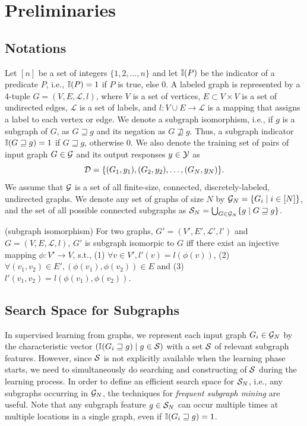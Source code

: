 \section{Preliminaries}
\subsection{Notations}
Let $[n]$ be a set of integers $\{1,2,\dots,n\}$ 
and let $\I(P)$ be the indicator of a predicate $P$, 
i.e., $\I(P)=1$ if $P$ is true, else $0$. 
A labeled graph is represented by a 4-tuple $G = (V, E, \mathcal{L}, l)$, 
where $V$ is a set of vertices, $E \subset V \times V$ is a set of undirected edges, 
$\mathcal{L}$ is a set of labels, and $l: V \cup E \rightarrow \mathcal{L}$ is a mapping 
that assigns a label to each vertex or edge.
We denote a subgraph isomorphism, i.e., if $g$ is a subgraph of $G$, as $G \sqsupseteq g$ 
and its negation as $G \not\sqsupseteq g$. 
Thus, a subgraph indicator $\I(G \sqsupseteq g) = 1$ if $G \sqsupseteq g$, otherwise 0.
We also denote the training set of pairs of input graph $G \in \Graph$ 
and its output responses $y \in \Y$ as
\begin{equation}
  \label{eq:train_data}
  \D = \{(G_1,y_1),(G_2,y_2),\dots,(G_N,y_N)\}.
\end{equation}
We assume that $\Graph$ is a set of all finite-size, connected, discretely-labeled, undirected graphs. 
We denote any set of graphs of size $N$ by $\Graph_N = \{G_i\mid i \in [N]\}$, 
and the set of all possible connected subgraphs 
as $\S_N = \bigcup_{G \in \Graph_N} \{g \mid G \sqsupseteq g\}$.

\begin{definition}{(subgraph isomorphism)}
	For two graphs, $G' = (V', E', \mathcal{L}', l')$ and $G = (V, E, \mathcal{L}, l)$, 
	$G'$ is subgraph isomorpic to $G$ iff there exist an injective mapping $\phi: V' \rightarrow V$, 
	s.t., (1) $\forall v \in V', l'(v) = l(\phi(v))$, 
	(2) $\forall (v_{1}, v_{2}) \in E', (\phi(v_{1}), \phi(v_{2})) \in E$ and
	(3) $l'(v_{1}, v_{2}) = l(\phi(v_{1}), \phi(v_{2}))$.
\end{definition}

\subsection{Search Space for Subgraphs}
\label{sec:subgraphMining}
In supervised learning from graphs, we represent each input graph $G_i \in
\Graph_N$ by the characteristic vector $(\I(G_i \sqsupseteq g) \mid g \in
\S) $ with a set $\S$ of relevant subgraph features. However, since $\S$ is not
explicitly available when the learning phase starts, we need to
simultaneously do searching and constructing of $\S$ during the learning process.
In order to define an efficient search space for $\S_N$, i.e., any subgraphs occurring in $\Graph_N$,
the techniques for \textit{frequent subgraph mining} \cite{Yan:2002, Nijssen:2004} are
useful. Note that any subgraph feature
$g \in \S_N$ can occur multiple times at multiple locations in a single graph,
even if $\I(G_i \sqsupseteq g) = 1$.

